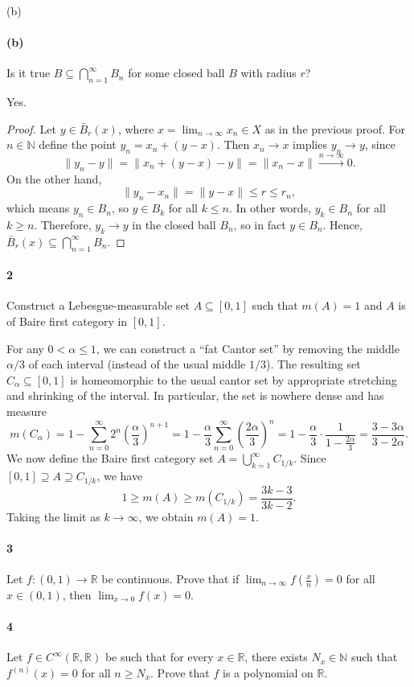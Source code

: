 \documentclass[12pt]{article}
\newlength{\myparskip}
\newenvironment{fullbox}{\begin{lrbox}{\savefullbox}\begin{minipage}{\dimexpr\textwidth-2\fboxsep\relax}\setlength{\parskip}{\myparskip}}{\end{minipage}\end{lrbox}\framebox[\textwidth]{\usebox{\savefullbox}}}
\newenvironment{pbox}[1][]{\begin{fullbox}\ifx#1\empty\else\paragraph{#1}\phantom{}\fi}{\end{fullbox}}
\theoremstyle{definition}
\newcommand{\N}{\mathbb{N}}
\newcommand{\R}{\mathbb{R}}
\newcommand{\<}{\langle}
\renewcommand{\>}{\rangle}
\newcommand{\seq}{\subseteq}
\begin{document}
\newpage
\begin{pbox}[(b)]
    Is it true $B \seq \bigcap_{n=1}^{\infty} B_n$ for some closed ball $B$ with radius $r$?
\end{pbox}

Yes.

\begin{proof}
    Let $y \in \bar{B}_r(x)$, where $x = \lim_{n \to \infty} x_n \in X$ as in the previous proof.
    For $n \in \N$ define the point $y_n = x_n + (y - x)$.
    Then $x_n \to x$ implies $y_n \to y$, since
    \[
        \|y_n - y\| = \|x_n + (y - x) - y\| = \|x_n - x\| \xrightarrow{n \to \infty} 0.
    \]
    On the other hand,
    \[
        \|y_n - x_n\| = \|y - x\| \leq r \leq r_n,
    \]
    which means $y_n \in B_n$, so $y \in B_k$ for all $k \leq n$.
    In other words, $y_k \in B_n$ for all $k \geq n$.
    Therefore, $y_k \to y$ in the closed ball $B_n$, so in fact $y \in B_n$.
    Hence, $\bar{B}_r(x) \seq \bigcap_{n=1}^{\infty} B_n$.
\end{proof}

\newpage
\begin{pbox}[2]
    Construct a Lebesgue-measurable set $A \seq [0, 1]$ such that $m(A) = 1$ and $A$ is of Baire first category in $[0, 1]$.
\end{pbox}  

For any $0 < \alpha \leq 1$, we can construct a ``fat Cantor set'' by removing the middle $\alpha/3$ of each interval (instead of the usual middle $1/3$).
The resulting set $C_\alpha \seq [0, 1]$ is homeomorphic to the usual cantor set by appropriate stretching and shrinking of the interval.
In particular, the set is nowhere dense and has measure
\[
    m(C_\alpha)
        = 1 - \sum_{n=0}^{\infty} 2^n \left(\frac{\alpha}{3}\right)^{n+1}
        = 1 - \frac{\alpha}{3} \sum_{n=0}^{\infty} \left(\frac{2\alpha}{3}\right)^{n}
        = 1 - \frac{\alpha}{3} \cdot \frac{1}{1 - \frac{2\alpha}{3}}
        = \frac{3 - 3\alpha}{3 - 2\alpha}.
\]
We now define the Baire first category set $A = \bigcup_{k=1}^{\infty} C_{1/k}$.
Since $[0, 1] \supseteq A \supseteq C_{1/k}$, we have
\[
    1 \geq m(A) \geq m(C_{1/k}) = \frac{3k - 3}{3k - 2}.
\]
Taking the limit as $k \to \infty$, we obtain $m(A) = 1$.



\newpage
\begin{pbox}[3]
    Let $f : (0, 1) \to \R$ be continuous.
    Prove that if $\lim_{n \to \infty} f(\frac{x}{n}) = 0$ for all $x \in (0, 1)$, then $\lim_{x \to 0} f(x) = 0$.
\end{pbox}


\newpage
\begin{pbox}[4]
    Let $f \in C^\infty(\R, \R)$ be such that for every $x \in \R$, there exists $N_x \in \N$ such that $f^{(n)}(x) = 0$ for all $n \geq N_x$.
    Prove that $f$ is a polynomial on $\R$.
\end{pbox}
\end{document}

